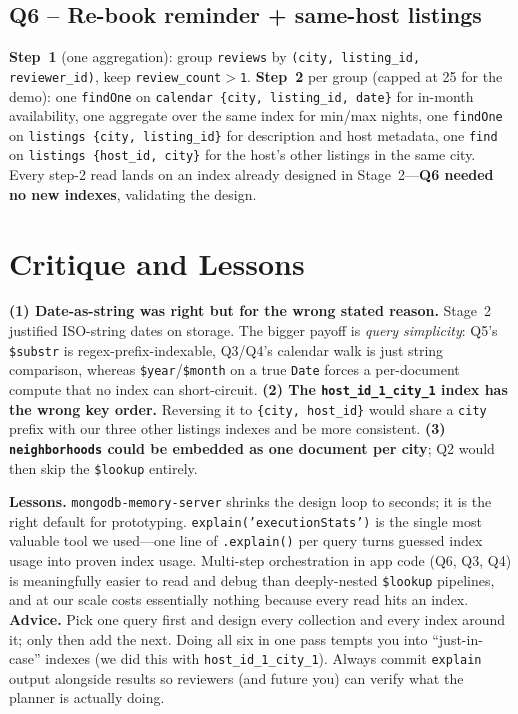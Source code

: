 \documentclass[10pt]{article}
\begin{document}
\subsection{Q6 -- Re-book reminder + same-host listings}
\textbf{Step~1} (one aggregation): group \texttt{reviews} by \texttt{(city, listing\_id, reviewer\_id)}, keep \texttt{review\_count$>$1}. \textbf{Step~2} per group (capped at 25 for the demo): one \texttt{findOne} on \texttt{calendar~\{city,~listing\_id,~date\}} for in-month availability, one aggregate over the same index for min/max nights, one \texttt{findOne} on \texttt{listings~\{city,~listing\_id\}} for description and host metadata, one \texttt{find} on \texttt{listings~\{host\_id,~city\}} for the host's other listings in the same city. Every step-2 read lands on an index already designed in Stage~2---\textbf{Q6 needed no new indexes}, validating the design.

\section{Critique and Lessons}

\textbf{(1) Date-as-string was right but for the wrong stated reason.} Stage~2 justified ISO-string dates on storage. The bigger payoff is \emph{query simplicity}: Q5's \texttt{\$substr} is regex-prefix-indexable, Q3/Q4's calendar walk is just string comparison, whereas \texttt{\$year}/\texttt{\$month} on a true \texttt{Date} forces a per-document compute that no index can short-circuit. \textbf{(2) The \texttt{host\_id\_1\_city\_1} index has the wrong key order.} Reversing it to \texttt{\{city, host\_id\}} would share a \texttt{city} prefix with our three other listings indexes and be more consistent. \textbf{(3) \texttt{neighborhoods} could be embedded as one document per city}; Q2 would then skip the \texttt{\$lookup} entirely.

\textbf{Lessons.} \texttt{mongodb-memory-server} shrinks the design loop to seconds; it is the right default for prototyping. \texttt{explain('executionStats')} is the single most valuable tool we used---one line of \texttt{.explain()} per query turns guessed index usage into proven index usage. Multi-step orchestration in app code (Q6, Q3, Q4) is meaningfully easier to read and debug than deeply-nested \texttt{\$lookup} pipelines, and at our scale costs essentially nothing because every read hits an index. \textbf{Advice.} Pick one query first and design every collection and every index around it; only then add the next. Doing all six in one pass tempts you into ``just-in-case'' indexes (we did this with \texttt{host\_id\_1\_city\_1}). Always commit \texttt{explain} output alongside results so reviewers (and future you) can verify what the planner is actually doing.
\end{document}
